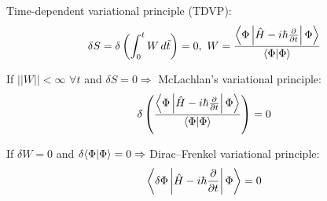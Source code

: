 \begin{frame}{ }

\begin{block}{Time-dependent variational principle (TDVP):}
$$\delta S = \delta\left(\int_{0}^{t} W\,d\tilde{t}\right)=0,\ %
W = \frac{ \mymean{\Phi}  { \hat{H}-i\hbar\frac{\partial}{\partial t} }  %
			  { \Phi } }{ \myel{\Phi}{\Phi} }$$
\end{block}

\begin{block}{If $||W||<\infty$  $\forall t$ and $\delta S = 0\Rightarrow $ McLachlan's variational principle:}
$$\delta\left(\frac{ \mymean{\Phi} %
	 	{ \hat{H}-i\hbar\frac{\partial}{\partial t} }  %
		{ \Phi } }{ \myel{\Phi}{\Phi} } \right) = 0$$
\end{block}

\begin{block}{If $\delta W = 0$ and $\delta\langle \Phi | \Phi \rangle=0\Rightarrow$ Dirac--Frenkel variational principle:}
$$\left\langle \delta\Phi \left|  \hat{H}-i\hbar\frac{\partial}{\partial t}  \right|  \Phi  \right\rangle = 0$$
\end{block}
\end{frame}

